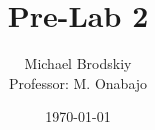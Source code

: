 


\title{Pre-Lab 2}
\date{\today}
\author{Michael Brodskiy\\ \small Professor: M. Onabajo}



\maketitle

